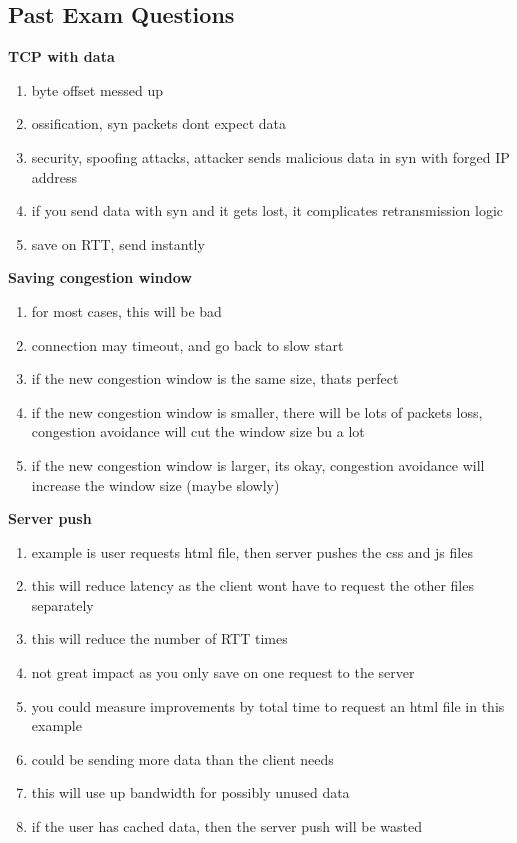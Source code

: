 \documentclass{article}
\begin{document}
\clearpage

\subsection*{Past Exam Questions}

\textbf{TCP with data}

\begin{enumerate}
    \item byte offset messed up
    \item ossification, syn packets dont expect data
    \item security, spoofing attacks, attacker sends malicious data in syn with forged IP address
    \item if you send data with syn and it gets lost, it complicates retransmission logic
    \item save on RTT, send instantly
\end{enumerate}


\textbf{Saving congestion window}
\begin{enumerate}
    \item for most cases, this will be bad
    \item connection may timeout, and go back to slow start
    \item if the new congestion window is the same size, thats perfect
    \item if the new congestion window is smaller, there will be lots of packets loss, congestion avoidance will cut the window size bu a lot
    \item if the new congestion window is larger, its okay, congestion avoidance will increase the window size (maybe slowly)
\end{enumerate}


\textbf{Server push}
\begin{enumerate}
    \item example is user requests html file, then server pushes the css and js files
    \item this will reduce latency as the client wont have to request the other files separately
    \item this will reduce the number of RTT times
    \item not great impact as you only save on one request to the server
    \item you could measure improvements by total time to request an html file in this example
    \item could be sending more data than the client needs
    \item this will use up bandwidth for possibly unused data
    \item if the user has cached data, then the server push will be wasted
\end{enumerate}
\end{document}
